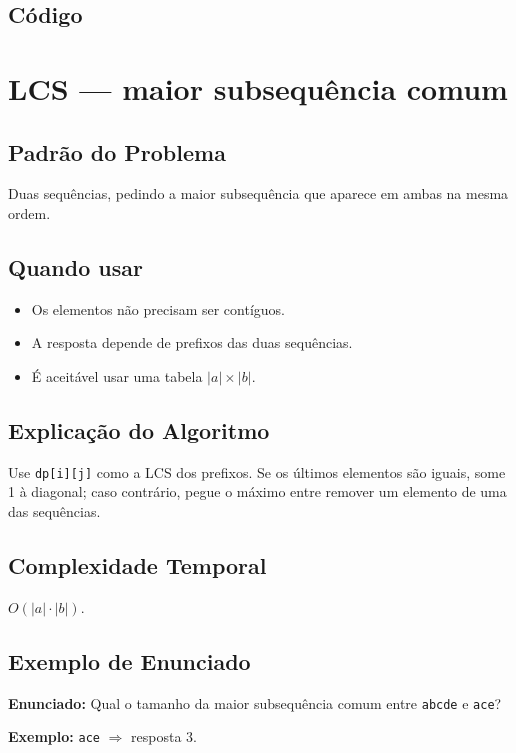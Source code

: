 \subsection{Código}

\section{LCS --- maior subsequência comum}

\subsection{Padrão do Problema}
Duas sequências, pedindo a maior subsequência que aparece em ambas na mesma ordem.

\subsection{Quando usar}
\begin{itemize}[nosep]
  \item Os elementos não precisam ser contíguos.
  \item A resposta depende de prefixos das duas sequências.
  \item É aceitável usar uma tabela $|a| \times |b|$.
\end{itemize}

\subsection{Explicação do Algoritmo}
Use \texttt{dp[i][j]} como a LCS dos prefixos. Se os últimos elementos são iguais, some 1 à diagonal; caso contrário, pegue o máximo entre remover um elemento de uma das sequências.

\subsection{Complexidade Temporal}
$O(|a| \cdot |b|)$.

\subsection{Exemplo de Enunciado}
\begin{exemplodiabox}
\textbf{Enunciado:} Qual o tamanho da maior subsequência comum entre \texttt{abcde} e \texttt{ace}?

\textbf{Exemplo:} \texttt{ace} $\Rightarrow$ resposta $3$.
\end{exemplodiabox}

